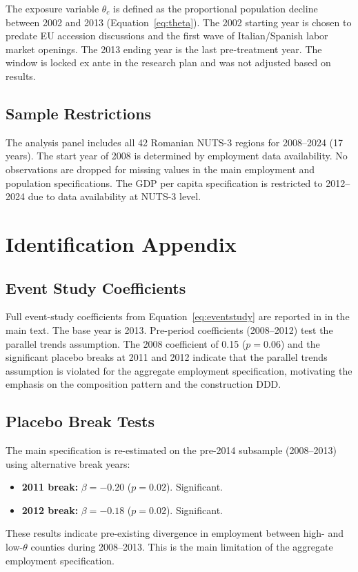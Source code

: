 \documentclass[12pt]{article}
\begin{document}
The exposure variable $\theta_c$ is defined as the proportional population decline between 2002 and 2013 (Equation~\ref{eq:theta}). The 2002 starting year is chosen to predate EU accession discussions and the first wave of Italian/Spanish labor market openings. The 2013 ending year is the last pre-treatment year. The window is locked ex ante in the research plan and was not adjusted based on results.

\subsection{Sample Restrictions}

The analysis panel includes all 42 Romanian NUTS-3 regions for 2008--2024 (17 years). The start year of 2008 is determined by employment data availability. No observations are dropped for missing values in the main employment and population specifications. The GDP per capita specification is restricted to 2012--2024 due to data availability at NUTS-3 level.


\section{Identification Appendix}
\label{app:identification}

\subsection{Event Study Coefficients}

Full event-study coefficients from Equation~\eqref{eq:eventstudy} are reported in  in the main text. The base year is 2013. Pre-period coefficients (2008--2012) test the parallel trends assumption. The 2008 coefficient of 0.15 ($p = 0.06$) and the significant placebo breaks at 2011 and 2012 indicate that the parallel trends assumption is violated for the aggregate employment specification, motivating the emphasis on the composition pattern and the construction DDD.

\subsection{Placebo Break Tests}

The main specification is re-estimated on the pre-2014 subsample (2008--2013) using alternative break years:
\begin{itemize}
\item \textbf{2011 break:} $\beta = -0.20$ ($p = 0.02$). Significant.
\item \textbf{2012 break:} $\beta = -0.18$ ($p = 0.02$). Significant.
\end{itemize}
These results indicate pre-existing divergence in employment between high- and low-$\theta$ counties during 2008--2013. This is the main limitation of the aggregate employment specification.
\end{document}
